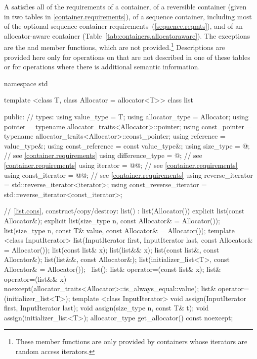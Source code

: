 \pnum
A  satisfies all of the requirements of a container, of
a reversible container (given in two tables in
\ref{container.requirements}), of a sequence container,
including most of the optional sequence container
requirements~(\ref{sequence.reqmts}), and of an allocator-aware container
(Table~\ref{tab:containers.allocatoraware}).
The exceptions are the
and
member functions, which are not provided.\footnote{These member functions
are only provided by containers whose iterators
are random access iterators.
}
Descriptions are provided here only for operations on
that are not described in one of these tables
or for operations where there is additional semantic information.

\begin{codeblock}
namespace std {
  template <class T, class Allocator = allocator<T>>
  class list {
  public:
    // types:
    using value_type             = T;
    using allocator_type         = Allocator;
    using pointer                = typename allocator_traits<Allocator>::pointer;
    using const_pointer          = typename allocator_traits<Allocator>::const_pointer;
    using reference              = value_type&;
    using const_reference        = const value_type&;
    using size_type              = @\impdef@; // see \ref{container.requirements}
    using difference_type        = @\impdef@; // see \ref{container.requirements}
    using iterator               = @@; // see \ref{container.requirements}
    using const_iterator         = @@; // see \ref{container.requirements}
    using reverse_iterator       = std::reverse_iterator<iterator>;
    using const_reverse_iterator = std::reverse_iterator<const_iterator>;

    // \ref{list.cons}, construct/copy/destroy:
    list() : list(Allocator()) { }
    explicit list(const Allocator&);
    explicit list(size_type n, const Allocator& = Allocator());
    list(size_type n, const T& value, const Allocator& = Allocator());
    template <class InputIterator>
      list(InputIterator first, InputIterator last, const Allocator& = Allocator());
    list(const list& x);
    list(list&& x);
    list(const list&, const Allocator&);
    list(list&&, const Allocator&);
    list(initializer_list<T>, const Allocator& = Allocator());
    ~list();
    list& operator=(const list& x);
    list& operator=(list&& x)
      noexcept(allocator_traits<Allocator>::is_always_equal::value);
    list& operator=(initializer_list<T>);
    template <class InputIterator>
      void assign(InputIterator first, InputIterator last);
    void assign(size_type n, const T& t);
    void assign(initializer_list<T>);
    allocator_type get_allocator() const noexcept;

}}
\end{codeblock}
